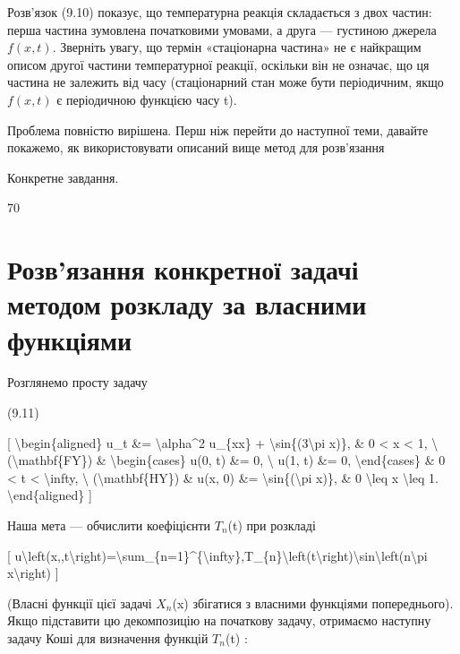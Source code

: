 \documentclass[
]{article}
\begin{document}
Розв'язок (9.10) показує, що температурна реакція складається з двох
частин: перша частина зумовлена початковими умовами, а друга ---
густиною джерела \(f(x,t)\). Зверніть увагу, що термін «стаціонарна
частина» не є найкращим описом другої частини температурної реакції,
оскільки він не означає, що ця частина не залежить від часу
(стаціонарний стан може бути періодичним, якщо \(f(x, t)\) є періодичною
функцією часу t).

Проблема повністю вирішена. Перш ніж перейти до наступної теми, давайте
покажемо, як використовувати описаний вище метод для розв'язання

Конкретне завдання.

70

\section{Розв'язання конкретної задачі методом розкладу за власними
функціями}\label{ux440ux43eux437ux432ux44fux437ux430ux43dux43dux44f-ux43aux43eux43dux43aux440ux435ux442ux43dux43eux457-ux437ux430ux434ux430ux447ux456-ux43cux435ux442ux43eux434ux43eux43c-ux440ux43eux437ux43aux43bux430ux434ux443-ux437ux430-ux432ux43bux430ux441ux43dux438ux43cux438-ux444ux443ux43dux43aux446ux456ux44fux43cux438}

Розглянемо просту задачу

(9.11)

{[} \textbackslash begin\{aligned\} u\_t \&= \textbackslash alpha\^{}2
u\_\{xx\} + \textbackslash sin\{(3\textbackslash pi x)\}, \& 0
\textless{} x \textless{} 1, \textbackslash{}
(\textbackslash mathbf\{FY\}) \& \textbackslash begin\{cases\} u(0, t)
\&= 0, \textbackslash{} u(1, t) \&= 0, \textbackslash end\{cases\} \& 0
\textless{} t \textless{} \textbackslash infty, \textbackslash{}
(\textbackslash mathbf\{HY\}) \& u(x, 0) \&=
\textbackslash sin\{(\textbackslash pi x)\}, \& 0 \textbackslash leq x
\textbackslash leq 1. \textbackslash end\{aligned\} {]}

Наша мета --- обчислити коефіцієнти \(T_n\)(t) при розкладі

{[}
u\textbackslash left(x,,t\textbackslash right)=\textbackslash sum\_\{n=1\}\^{}\{\textbackslash infty\},T\_\{n\}\textbackslash left(t\textbackslash right)\textbackslash sin\textbackslash left(n\textbackslash pi
x\textbackslash right) {]}

(Власні функції цієї задачі \(X_n\)(x) збігатися з власними функціями
попереднього). Якщо підставити цю декомпозицію на початкову задачу,
отримаємо наступну задачу Коші для визначення функцій \(T_n\)(t) :
\end{document}
